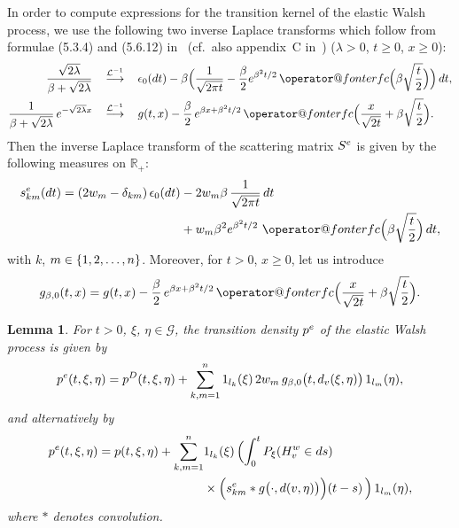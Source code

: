 \documentclass[11pt,a4paper]{amsart}
\makeatletter
\newcommand{\gb}{\beta}
\newcommand{\gd}{\delta}
\newcommand{\gep}{\epsilon}
\newcommand{\gl}{\lambda}
\newcommand{\cG}{\mathcal{G}}
\newcommand{\cL}{\mathcal{L}}
\newcommand{\1}{1}
\newcommand{\R}{\mathbb{R}}
\newtheorem{lemma}[theorem]{Lemma}
\theoremstyle{remark}
\newcommand{\erfc}{\mathop{\operator@font erfc}\nolimits}
\newcommand{\sgl}{\ensuremath\sqrt{2\gl}}
\newcommand{\sn}{\ensuremath\{1,2,\dotsc,n\}}
\newcommand{\onel}[1][k]{\ensuremath1_{l_{#1}}}
\newcommand{\TW}{\ensuremath H^w}
\newcommand{\peW}{\ensuremath p^e}
\newcommand{\SeW}{\ensuremath S^e}
\newcommand{\seW}{\ensuremath s^e}
\numberwithin{equation}{section}
\makeatother
\begin{document}
In order to compute expressions for the transition kernel of the elastic Walsh
process, we use the following two inverse Laplace transforms which follow from
formulae (5.3.4) and (5.6.12) in~\cite{ErMa54a} (cf.\ also appendix~C
in~\cite{BMMG0}) ($\gl>0$, $t\ge 0$, $x\ge0$):
\begin{align}
    \frac{\sgl}{\gb+\sgl}\quad
        &\mathop{\longrightarrow}^{\cL^{-1}}\quad
            \gep_0(dt) - \gb\Bigl(\frac{1}{\sqrt{2\pi t}}-\frac{\gb}{2}e^{\gb^2 t/2}
            \erfc\Bigl(\gb\sqrt{\frac{t}{2}}\Bigr)\Bigr)\,dt,\label{eq3.7}\\
    \frac{1}{\gb+\sgl}\,e^{-\sgl x}\quad
        &\mathop{\longrightarrow}^{\cL^{-1}}\quad
            g(t,x) - \frac{\gb}{2}\,e^{\gb x+ \gb^2 t/2}
            \erfc\Bigl(\frac{x}{\sqrt{2t}}+\gb\sqrt{\frac{t}{2}}\Bigr).\label{eq3.8}
\end{align}
Then the inverse Laplace transform of the scattering matrix $\SeW$ is given by
the following measures on $\R_+$:
\begin{equation}    \label{eq3.9}
 \begin{split}
    \seW_{km}(dt)
        = (2w_m-\gd_{km})\,\gep_0(dt) &- 2w_m\gb\,\frac{1}{\sqrt{2\pi t}}\,dt\\
        & + w_m\gb^2 e^{\gb^2t/2}\,\erfc\Bigl(\gb\sqrt{\frac{t}{2}}\Bigr)\,dt,
\end{split}
\end{equation}
with $k$, $m\in\sn$. Moreover, for $t>0$, $x\ge 0$, let us introduce
\begin{equation}    \label{eq3.10}
    g_{\gb,0}(t,x) = g(t,x) - \frac{\gb}{2}\,e^{\gb x+ \gb^2 t/2}
            \erfc\Bigl(\frac{x}{\sqrt{2t}}+\gb\sqrt{\frac{t}{2}}\Bigr).
\end{equation}

\begin{lemma}   \label{lem3.6}
For $t>0$, $\xi$, $\eta\in\cG$, the transition density $\peW$ of the elastic Walsh process
is given by
\begin{equation} \label{eq3.11}
    \peW(t,\xi,\eta)
        = p^D(t,\xi,\eta) + \sum_{k,m=1}^n \onel(\xi)\, 2w_m\,g_{\gb,0}\bigl(t,d_v(\xi,\eta)\bigr)\,
            \onel[m](\eta),
\end{equation}
and alternatively by
\begin{equation}    \label{eq3.12}
\begin{split}
    \peW(t,\xi,\eta)
        = p(t,\xi,\eta) + \sum_{k,m=1}^n &\onel(\xi)\,\Bigl(\int_0^t P_\xi(\TW_v\in ds)\\
            &\times \Bigl(\seW_{km}*g\bigl(\cdot,d(v,\eta)\bigr)\Bigr)(t-s)\,
                \Bigr)\,\onel[m](\eta),
\end{split}
\end{equation}
where $*$ denotes convolution.
\end{lemma}
\end{document}
